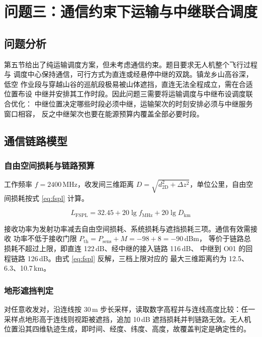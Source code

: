 \section{问题三：通信约束下运输与中继联合调度}
\label{sec:p3}

\subsection{问题分析}

第五节给出了纯运输调度方案，但未考虑通信约束。题目要求无人机整个飞行过程与
调度中心保持通信，可行方式为直连或经悬停中继的双跳。镇龙乡山高谷深，低空
作业段与穿越山谷的巡航段极易被山体遮挡，直连无法全程成立，需在合适位置布设
中继并安排其工作时段。因此问题三需要将运输调度与中继布设调度联合优化：
中继位置决定哪些时段必须中继，运输架次的时刻安排必须与中继服务窗口相容，
反之中继架次也要在能源预算内覆盖全部必要时段。

\subsection{通信链路模型}

\subsubsection{自由空间损耗与链路预算}

工作频率 $f=2400$\,MHz，收发间三维距离
$D=\sqrt{d_{\mathrm{2D}}^2+\Delta z^2}$，单位公里，自由空间损耗按式
\eqref{eq:fspl} 计算\cite{refITU}。

\begin{equation}
L_{\mathrm{FSPL}}=32.45+20\lg f_{\mathrm{MHz}}+20\lg D_{\mathrm{km}}
\label{eq:fspl}
\end{equation}

接收功率为发射功率减去自由空间损耗、系统损耗与遮挡损耗三项。通信有效需接收
功率不低于接收门限 $P_{\mathrm{th}}=P_{\mathrm{sens}}+M=-98+8=-90$\,dBm，
等价于链路总损耗不超过上限，即直连 122\,dB、经中继的接入链路 116\,dB、
中继到 O01 的回程链路 126\,dB。由式 \eqref{eq:fspl} 反解，三档上限对应的
最大三维距离约为 12.5、6.3、10.7\,km。

\subsubsection{地形遮挡判定}

对任意收发对，沿连线按 30\,m 步长采样，读取数字高程并与连线高度比较：任一
采样点地形高于连线则视距被遮挡，追加 10\,dB 遮挡损耗并判链路无效。无人机
位置沿其四维轨迹生成，即时间、经度、纬度、高度，故覆盖判定是确定性的。

